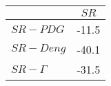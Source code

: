 \begin{tabular}{l|c}
\toprule
{} &  $SR$ \\
\midrule
\textbf{$SR-PDG$   } & -11.5 \\
\textbf{$SR-Deng$  } & -40.1 \\
\textbf{$SR-\Gamma$} & -31.5 \\
\bottomrule
\end{tabular}
